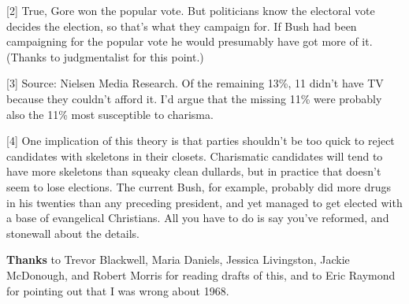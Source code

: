 {[}2{]} True, Gore won the popular vote. But politicians know the
electoral vote decides the election, so that's what they campaign for.
If Bush had been campaigning for the popular vote he would presumably
have got more of it. (Thanks to judgmentalist for this point.)

{[}3{]} Source: Nielsen Media Research. Of the remaining 13\%, 11 didn't
have TV because they couldn't afford it. I'd argue that the missing 11\%
were probably also the 11\% most susceptible to charisma.

{[}4{]} One implication of this theory is that parties shouldn't be too
quick to reject candidates with skeletons in their closets. Charismatic
candidates will tend to have more skeletons than squeaky clean dullards,
but in practice that doesn't seem to lose elections. The current Bush,
for example, probably did more drugs in his twenties than any preceding
president, and yet managed to get elected with a base of evangelical
Christians. All you have to do is say you've reformed, and stonewall
about the details.

\textbf{Thanks} to Trevor Blackwell, Maria Daniels, Jessica Livingston,
Jackie McDonough, and Robert Morris for reading drafts of this, and to
Eric Raymond for pointing out that I was wrong about 1968.
